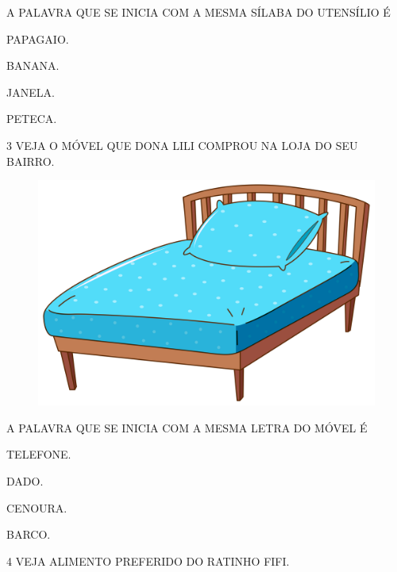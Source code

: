 A PALAVRA QUE SE INICIA COM A MESMA SÍLABA DO UTENSÍLIO É

\begin{escolha}

\item PAPAGAIO.

\item BANANA.

\item JANELA.

\item PETECA.

\end{escolha}

\num{3} VEJA O MÓVEL QUE DONA LILI COMPROU NA LOJA DO SEU BAIRRO.

\begin{figure}[H]
\centering
\includegraphics[width=.6\textwidth]{./media/image212.jpg}
\end{figure}

A PALAVRA QUE SE INICIA COM A MESMA LETRA DO MÓVEL É

\begin{escolha}

\item TELEFONE.

\item DADO.

\item CENOURA.

\item BARCO.


\end{escolha}

\num{4} VEJA ALIMENTO PREFERIDO DO RATINHO FIFI.

